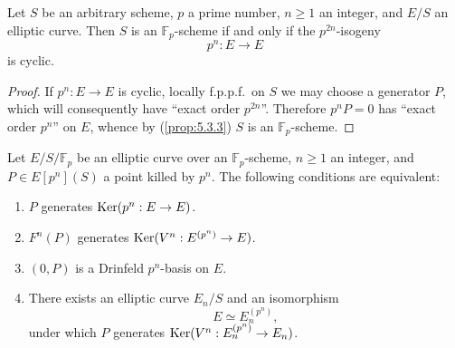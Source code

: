 \begin{kcor}\label{cor:12.2.6}
Let $S$ be an arbitrary scheme, $p$ a prime number, $n \ge 1$ an integer, and $E/S$ an elliptic curve. Then $S$ is an $\mathbb{F}_p$-scheme if and only if the $p^{2n}$-isogeny
\[
p^n : E \to E
\]
is cyclic.
\end{kcor}

\begin{proof}
If $p^n : E \to E$ is cyclic, locally f.p.p.f.\ on $S$ we may choose a generator $P$, which will consequently have ``exact order $p^{2n}$''. Therefore $p^n P = 0$ has ``exact order $p^n$'' on $E$, whence by (\ref{prop:5.3.3}) $S$ is an $\mathbb{F}_p$-scheme.
\end{proof}

\begin{kprop}\label{prop:12.2.7}
Let $E/S/\mathbb{F}_p$ be an elliptic curve over an $\mathbb{F}_p$-scheme, $n \ge 1$ an integer, and $P \in E[p^n](S)$ a point killed by $p^n$. The following conditions are equivalent:
\begin{enumerate}[label=(\arabic*)]
\item $P$ generates $\operatorname{Ker}(p^n : E \to E)$.
\item $F^n(P)$ generates $\operatorname{Ker}(V^n : E^{(p^n)} \to E)$.
\item $(0, P)$ is a Drinfeld $p^n$-basis on $E$.
\item There exists an elliptic curve $E_n/S$ and an isomorphism
\[
E \simeq E_n^{(p^n)} ,
\]
under which $P$ generates $\operatorname{Ker}(V^n : E_n^{(p^n)} \to E_n)$.
\end{enumerate}
\end{kprop}

